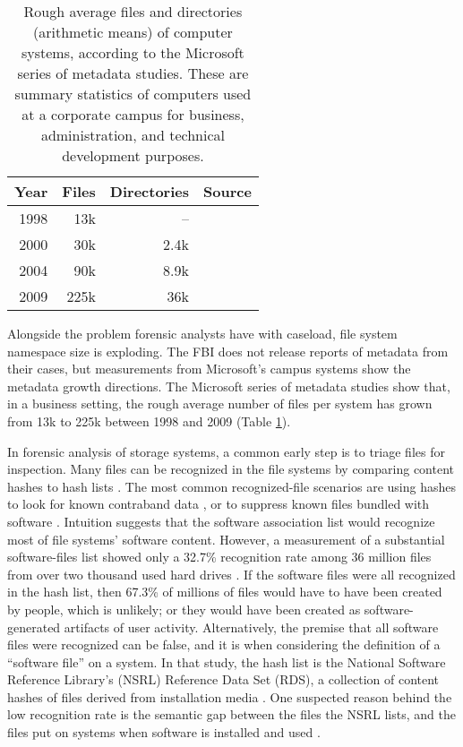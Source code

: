 \documentclass[11pt]{ucthesis}
\theoremstyle{plain}
\theoremstyle{definition}
\begin{document}
\begin{table}[htp]
\begin{small}
\caption{Rough average files and directories (arithmetic means) of computer systems, according to the Microsoft series of metadata studies.  These are summary statistics of computers used at a corporate campus for business, administration, and technical development purposes.}
\begin{center}
\begin{tabular}{rrrl}
\toprule
Year & Files & Directories & Source \\
\midrule
1998 & 13k & -- & \cite[Table 2]{douceur:sigmetrics99} \\
2000 & 30k & 2.4k & \cite[Section 3.1]{agrawal:fast07} \\
2004 & 90k & 8.9k & \cite[Section 3.1]{agrawal:fast07} \\
2009 & 225k & 36k & \cite[Section 4.3]{meyer:fast11} \\
\bottomrule
\end{tabular}
\end{center}
\label{tbl:microsoftmetasummaries}
\end{small}
\end{table}%

Alongside the problem forensic analysts have with caseload, file system namespace size is exploding.  The FBI does not release reports of metadata from their cases, but measurements from Microsoft's campus systems show the metadata growth directions.  The Microsoft series of metadata studies show that, in a business setting, the rough average number of files per system has grown from 13k to 225k between 1998 and 2009 (Table \ref{tbl:microsoftmetasummaries}).

In forensic analysis of storage systems, a common early step is to triage files for inspection.  Many files can be recognized in the file systems by comparing content hashes to hash lists \cite{farrell:acsac08}.  The most common recognized-file scenarios are using hashes to look for known contraband data \cite{jones:dfrws12}, or to suppress known files bundled with software \cite{white:aafs14,kim:dfrws06}.  Intuition suggests that the software association list would recognize most of file systems' software content.  However, a measurement of a substantial software-files list showed only a 32.7\% recognition rate among 36 million files from over two thousand used hard drives \cite{rowe:dfrws12}.  If the software files were all recognized in the hash list, then 67.3\% of millions of files would have to have been created by people, which is unlikely; or they would have been created as software-generated artifacts of user activity.  Alternatively, the premise that all software files were recognized can be false, and it is when considering the definition of a ``software file'' on a system.  In that study, the hash list is the National Software Reference Library's (NSRL) Reference Data Set (RDS), a collection of content hashes of files derived from installation media \cite{white:aafs14}.  One suspected reason behind the low recognition rate is the semantic gap between the files the NSRL lists, and the files put on systems when software is installed and used \cite[Section 7]{rowe:dfrws12}.
\end{document}
